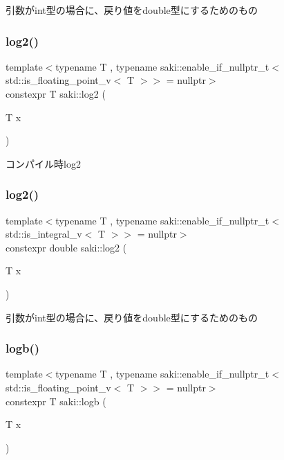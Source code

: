 引数がint型の場合に、戻り値をdouble型にするためのもの 

\mbox{\label{namespacesaki_ac184cde6c3531e01531219e081e25452}} 
\subsubsection{\texorpdfstring{log2()}{log2()}\hspace{0.1cm}{\footnotesize\ttfamily [1/2]}}
{\footnotesize\ttfamily template$<$typename T , typename saki\+::enable\+\_\+if\+\_\+nullptr\+\_\+t$<$ std\+::is\+\_\+floating\+\_\+point\+\_\+v$<$ T $>$$>$  = nullptr$>$ \\
constexpr T saki\+::log2 (\begin{DoxyParamCaption}\item[{T}]{x }\end{DoxyParamCaption})}



コンパイル時log2 

\mbox{\label{namespacesaki_a8cb2f664389aab32abc797d9a60db4dc}} 
\subsubsection{\texorpdfstring{log2()}{log2()}\hspace{0.1cm}{\footnotesize\ttfamily [2/2]}}
{\footnotesize\ttfamily template$<$typename T , typename saki\+::enable\+\_\+if\+\_\+nullptr\+\_\+t$<$ std\+::is\+\_\+integral\+\_\+v$<$ T $>$$>$  = nullptr$>$ \\
constexpr double saki\+::log2 (\begin{DoxyParamCaption}\item[{T}]{x }\end{DoxyParamCaption})}



引数がint型の場合に、戻り値をdouble型にするためのもの 

\mbox{\label{namespacesaki_ab7e81af48b13fbf88f135d296471bac1}} 
\subsubsection{\texorpdfstring{logb()}{logb()}\hspace{0.1cm}{\footnotesize\ttfamily [1/2]}}
{\footnotesize\ttfamily template$<$typename T , typename saki\+::enable\+\_\+if\+\_\+nullptr\+\_\+t$<$ std\+::is\+\_\+floating\+\_\+point\+\_\+v$<$ T $>$$>$  = nullptr$>$ \\
constexpr T saki\+::logb (\begin{DoxyParamCaption}\item[{T}]{x }\end{DoxyParamCaption})}




